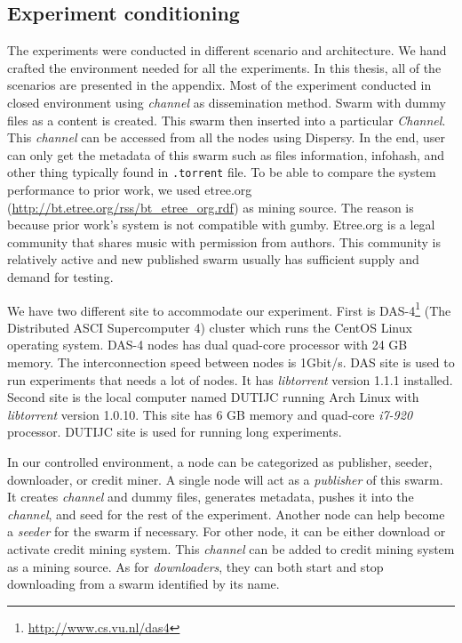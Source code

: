 \subsection{Experiment conditioning}
The experiments were conducted in different scenario and architecture. We hand crafted the environment needed for all the experiments. In this thesis, all of the scenarios are presented in the appendix. Most of the experiment conducted in closed environment using \textit{channel} as dissemination method. Swarm with dummy files as a content is created. This swarm then inserted into a particular \textit{Channel}. This \textit{channel} can be accessed from all the nodes using Dispersy. In the end, user can only get the metadata of this swarm such as files information, infohash, and other thing typically found in \texttt{.torrent} file. To be able to compare the system performance to prior work, we used etree.org (\url{http://bt.etree.org/rss/bt_etree_org.rdf}) as mining source. The reason is because prior work's system is not compatible with gumby. Etree.org is a legal community that shares music with permission from authors. This community is relatively active and new published swarm usually has sufficient supply and demand for testing. 

We have two different site to accommodate our experiment. First is DAS-4\footnote{\url{http://www.cs.vu.nl/das4}} (The Distributed ASCI Supercomputer 4) cluster which runs the CentOS Linux operating system. DAS-4 nodes has dual quad-core processor with 24 GB memory. The interconnection speed between nodes is 1Gbit/s. DAS site is used to run experiments that needs a lot of nodes. It has \textit{libtorrent} version 1.1.1 installed. Second site is the local computer named DUTIJC running Arch Linux with \textit{libtorrent} version 1.0.10. This site has 6 GB memory and quad-core \textit{i7-920} processor. DUTIJC site is used for running long experiments. 

In our controlled environment, a node can be categorized as publisher, seeder, downloader, or credit miner. A single node will act as a \textit{publisher} of this swarm. It creates \textit{channel} and dummy files, generates metadata, pushes it into the \textit{channel}, and seed for the rest of the experiment. Another node can help become a \textit{seeder} for the swarm if necessary. For other node, it can be either download or activate credit mining system. This \textit{channel} can be added to credit mining system as a mining source. As for \textit{downloaders}, they can both start and stop downloading from a swarm identified by its name. 

